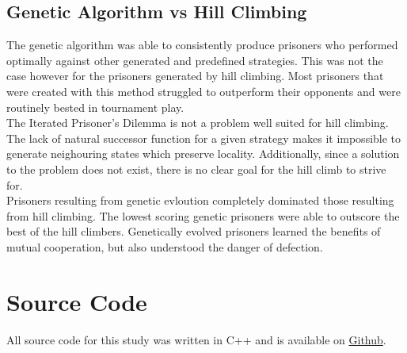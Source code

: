 \documentclass[12pt]{article}
\begin{document}
\subsection{Genetic Algorithm vs Hill Climbing}
The genetic algorithm was able to consistently produce prisoners who performed
optimally against other generated and predefined strategies. This was not the
case however for the prisoners generated by hill climbing. Most prisoners
that were created with this method struggled to outperform their opponents
and were routinely bested in tournament play. \\

The Iterated Prisoner's Dilemma is not a problem well suited for hill climbing.
The lack of natural successor function for a given strategy makes it impossible
to generate neighouring states which preserve locality.  Additionally, since
a solution to the problem does not exist, there is no clear goal for the hill climb
to strive for. \\


Prisoners resulting from genetic evloution completely dominated those resulting
from hill climbing.  The lowest scoring genetic prisoners were able to outscore
the best of the hill climbers.  Genetically evolved prisoners learned the benefits
of mutual cooperation, but also understood the danger of defection.

\pagebreak

\section{Source Code}
All source code for this study was written in C++ and is
available on
\href{https://github.com/Quinny/IteratedPrisoners}{Github}.
\end{document}
